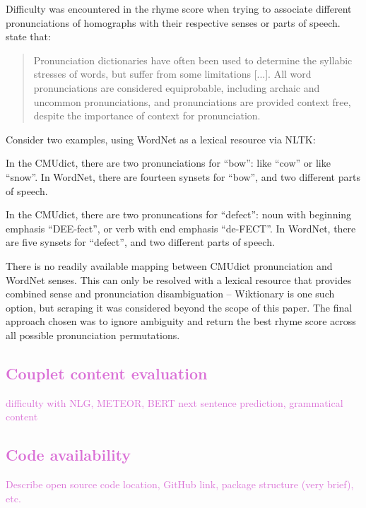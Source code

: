 \documentclass[11pt,a4paper]{article}
\newenvironment{tight_enumerate}{
\begin{enumerate}
\setlength{\itemsep}{0pt}
\setlength{\parskip}{0pt}
}{\end{enumerate}}
\begin{document}
Difficulty was encountered in the rhyme score when trying to associate different pronunciations of homographs with their respective senses or parts of speech. \citet{hopkins-kiela-2017} state that:

\begin{quote}
Pronunciation dictionaries have often been used to determine the syllabic stresses of words, but suffer from some limitations [...]. All word pronunciations are considered equiprobable, including archaic and uncommon pronunciations, and pronunciations are provided context free, despite the importance of context for pronunciation.
\end{quote}

Consider two examples, using WordNet \cite{wordnet} as a lexical resource via NLTK:
\begin{tight_enumerate}
	\vspace{-0.5em}
	\item
		In the CMUdict, there are two pronunciations for ``bow'': like ``cow'' or like ``snow''. In WordNet, there are fourteen synsets for ``bow'', and two different parts of speech.
	\item
		In the CMUdict, there are two pronuncations for ``defect'': noun with beginning emphasis ``DEE-fect'', or verb with end emphasis ``de-FECT''. In WordNet, there are five synsets for ``defect'', and two different parts of speech.
\end{tight_enumerate}

There is no readily available mapping between CMUdict pronunciation and WordNet senses. This can only be resolved with a lexical resource that provides combined sense and pronunciation disambiguation -- Wiktionary \cite{wiktionary} is one such option, but scraping it was considered beyond the scope of this paper. The final approach chosen was to ignore ambiguity and return the best rhyme score across all possible pronunciation permutations.

\textcolor{Orchid}{
\subsection{Couplet content evaluation}
\label{sec:nlg}
difficulty with NLG, METEOR, BERT next sentence prediction, grammatical content
}

\textcolor{Orchid}{
\subsection{Code availability}
Describe open source code location, GitHub link, package structure (very brief), etc.
}
\end{document}
